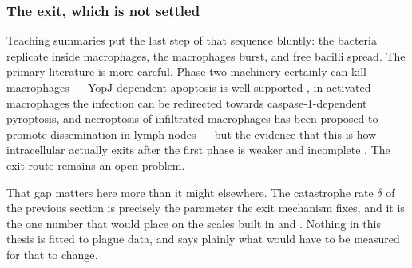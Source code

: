 \subsubsection*{The exit, which is not settled}

Teaching summaries put the last step of that sequence bluntly: the bacteria
replicate inside macrophages, the macrophages burst, and free bacilli spread.
The primary literature is more careful. Phase-two machinery certainly can kill
macrophages --- YopJ-dependent apoptosis is well supported
\cite{MonackEtAl1997}, in activated macrophages the infection can be redirected
towards caspase-1-dependent pyroptosis, and necroptosis of infiltrated
macrophages has been proposed to promote dissemination in lymph nodes
\cite{PetersEtAl2013} --- but the evidence that this is how intracellular \yp{}
actually exits after the first phase is weaker and incomplete
\cite{ZaubermanEtAl2006}. The exit route remains an open problem.

That gap matters here more than it might elsewhere. The catastrophe rate
$\delta$ of the previous section is precisely the parameter the exit mechanism
fixes, and it is the one number that would place \yp{} on the scales built in
 and
. Nothing in this thesis is fitted to plague
data, and  says plainly what would have to
be measured for that to change.
